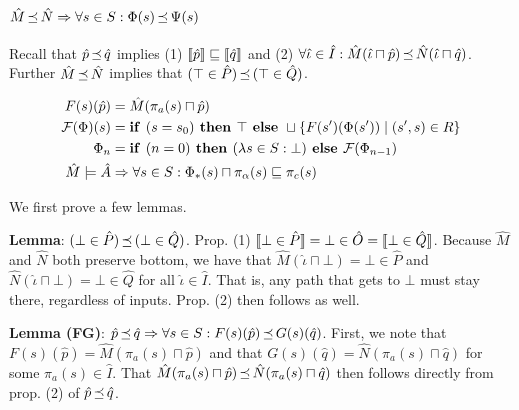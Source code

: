 \subsection{$\hat M \operatorname{\mathrel{\preceq}} \hat N \Rightarrow \forall s \in S : \Phi(s) \operatorname{\mathrel{\preceq}} \Psi(s)$}

Recall that $\hat p \operatorname{\mathrel{\preceq}} \hat q$ implies (1) $\llbracket\hat p\rrbracket \sqsubseteq \llbracket\hat q\rrbracket$ and (2) $\forall \hat \iota \in \hat I : \hat M(\hat \iota \sqcap \hat p) \operatorname{\mathrel{\preceq}} \hat N(\hat \iota \sqcap \hat q)$. Further $\hat M \operatorname{\mathrel{\preceq}} \hat N$ implies that $(\top \in \hat P) \operatorname{\mathrel{\preceq}} \, (\top \in \hat Q)$.

\begin{align*}
F(s)(\hat p) &= \hat M(\pi_{a}(s) \sqcap \hat p) \\
\mathcal{F}(\Phi)(s) &= \textrm{\textbf{if }} (s = s_{0}) \textrm{\textbf{ then }} \top \textrm{\textbf{ else }} \sqcup \{ F(s')(\Phi(s')) \mid (s',s) \in R \} \\
\Phi_{n} &= \textrm{\textbf{if }} (n = 0) \textrm{\textbf{ then }} (\lambda s \in S : \bot) \textrm{\textbf{ else }} \mathcal{F}(\Phi_{n-1}) \\
\hat M \models \hat A &\Rightarrow \forall s \in S : \Phi_{*}(s) \sqcap \pi_{\alpha}(s) \sqsubseteq \pi_{c}(s)
\end{align*}

We first prove a few lemmas.

\textbf{Lemma}: $(\bot \in \hat P) \operatorname{\mathrel{\preceq}} \, (\bot \in \hat Q)$. Prop. (1) $\llbracket\bot \in \hat P\rrbracket = \bot \in \hat O = \llbracket\bot \in \hat Q\rrbracket$. Because $\hat M$ and $\hat N$ both preserve bottom, we have that $\hat M(\hat \iota \sqcap \bot) = \bot \in \hat P$ and $\hat N(\hat \iota \sqcap \bot) = \bot \in \hat Q$ for all $\hat \iota \in \hat I$. That is, any path that gets to $\bot$ must stay there, regardless of inputs. Prop. (2) then follows as well.

\textbf{Lemma (FG)}: $\hat p \operatorname{\mathrel{\preceq}} \hat q \Rightarrow \forall s \in S : F(s)(\hat p) \operatorname{\mathrel{\preceq}} G(s)(\hat q)$. First, we note that $F(s)(\hat p) = \hat M(\pi_{a}(s) \sqcap \hat p)$ and that $G(s)(\hat q) = \hat N(\pi_{a}(s) \sqcap \hat q)$ for some $\pi_{a}(s) \in \hat I$. That $\hat M(\pi_{a}(s) \sqcap \hat p) \operatorname{\mathrel{\preceq}} \hat N(\pi_{a}(s) \sqcap \hat q)$ then follows directly from prop. (2) of $\hat p \operatorname{\mathrel{\preceq}} \hat q$.



